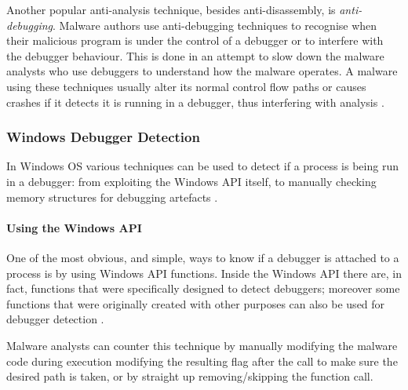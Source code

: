 \documentclass[pdfa%
,cucitura%
]{toptesi}
\begin{document}
Another popular anti-analysis technique, besides anti-disassembly, is \textit{anti-debugging}. Malware authors use anti-debugging techniques to recognise when their malicious program is under the control of a debugger or to interfere with the debugger behaviour. This is done in an attempt to slow down the malware analysts who use debuggers to understand how the malware operates. A malware using these techniques usually alter its normal control flow paths or causes crashes if it detects it is running in a debugger, thus interfering with analysis \cite{SikorskiPMA}.

\subsubsection{Windows Debugger Detection}
In Windows OS various techniques can be used to detect if a process is being run in a debugger: from exploiting the Windows API itself, to manually checking memory structures for debugging artefacts \cite{SikorskiPMA}.


\paragraph{Using the Windows API}
One of the most obvious, and simple, ways to know if a debugger is attached to a process is by using Windows API functions. Inside the Windows API there are, in fact, functions that were specifically designed to detect debuggers; moreover some functions that were originally created with other purposes can also be used for debugger detection \cite{SikorskiPMA}.

Malware analysts can counter this technique by manually modifying the malware code during execution modifying the resulting flag after the call to make sure the desired path is taken, or by straight up removing/skipping the function call.
\end{document}
